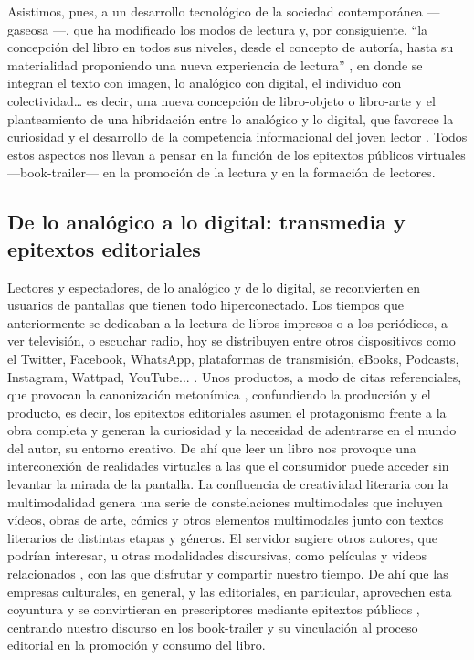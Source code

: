 \documentclass[spanish]{textolivre}
\begin{document}
Asistimos, pues, a un desarrollo tecnológico de la sociedad contemporánea —gaseosa \cite{scolari2021}—, que ha modificado los modos de lectura y, por consiguiente, “la concepción del libro en todos sus niveles, desde el concepto de autoría, hasta su materialidad proponiendo una nueva experiencia de lectura” \cite[p.74]{samperiz2020libro}, en donde se integran el texto con imagen, lo analógico con digital, el individuo con colectividad… es decir, una nueva concepción de libro-objeto o libro-arte \cite{colman2007new,taberneroellibro} y el planteamiento de una hibridación entre lo analógico y lo digital, que favorece la curiosidad \cite{taberneroleer} y el desarrollo de la competencia informacional del joven lector \cite{cordon2018combates}. Todos estos aspectos nos llevan a pensar en la función de los epitextos públicos virtuales —book-trailer— en la promoción de la lectura y en la formación de lectores.

\subsection{De lo analógico a lo digital: transmedia y epitextos editoriales}
Lectores y espectadores, de lo analógico y de lo digital, se reconvierten en usuarios de pantallas que tienen todo hiperconectado. Los tiempos que anteriormente se dedicaban a la lectura de libros impresos o a los periódicos, a ver televisión, o escuchar radio, hoy se distribuyen entre otros dispositivos como el Twitter, Facebook, WhatsApp, plataformas de transmisión, eBooks, Podcasts, Instagram, Wattpad, YouTube... \cite{scolari2020cultura}. Unos productos, a modo de citas referenciales, que provocan la canonización metonímica \cite[p.65]{compagnon2020segunda}, confundiendo la producción y el producto, es decir, los epitextos editoriales asumen el protagonismo frente a la obra completa y generan la curiosidad y la necesidad de adentrarse en el mundo del autor, su entorno creativo. De ahí que leer un libro nos provoque una interconexión de realidades virtuales a las que el consumidor puede acceder sin levantar la mirada de la pantalla. La confluencia de creatividad literaria con la multimodalidad \cite{caro2019clasico} genera una serie de constelaciones multimodales \cite{rovira2021intertextualidad} que incluyen vídeos, obras de arte, cómics y otros elementos multimodales junto con textos literarios de distintas etapas y géneros. El servidor sugiere otros autores, que podrían interesar, u otras modalidades discursivas, como películas y videos relacionados \cite{scolari2020cultura}, con las que disfrutar y compartir nuestro tiempo. De ahí que las empresas culturales, en general, y las editoriales, en particular, aprovechen esta coyuntura y se convirtieran en prescriptores mediante epitextos públicos \cite{tabernero2022promocion}, centrando nuestro discurso en los book-trailer y su vinculación al proceso editorial en la promoción y consumo del libro.
\end{document}
